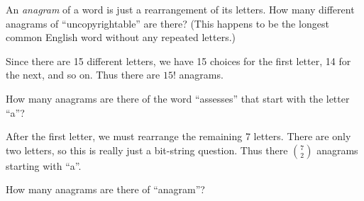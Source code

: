 \begin{questions}
  \begin{answer}
  \end{answer}




\question An \emph{anagram} of a word is just a rearrangement of its letters.  How many different anagrams of ``uncopyrightable'' are there?  (This happens to be the longest common English word without any repeated letters.)

	\begin{answer}
		Since there are 15 different letters, we have 15 choices for the first letter, 14 for the next, and so on.  Thus there are $15!$ anagrams.
	\end{answer}



\question How many anagrams are there of the word ``assesses'' that start with the letter ``a''? 

	\begin{answer}
	 After the first letter, we must rearrange the remaining 7 letters.  There are only two letters, so this is really just a bit-string question.  Thus there ${7 \choose 2}$ anagrams starting with ``a''.
	\end{answer}


\question How many anagrams are there of ``anagram''?


\end{questions}
